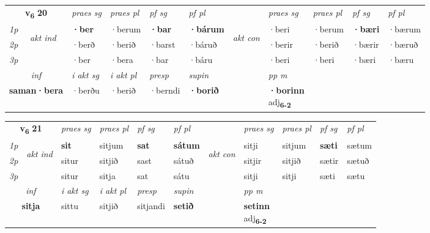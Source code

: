 \noindent
\begin{tabular}{lllllllllll} \toprule
\multicolumn{2}{c}{\textbf{v{\textsubscript{6}}} \Large{\textbf{20}}}  &  \textit{praes sg}  & \textit{praes pl}  &\textit{ pf sg} & \textit{pf pl} &  &  \textit{praes sg}  & \textit{praes pl}  & \textit{pf sg} & \textit{pf pl } \\*
	\cmidrule{3-6} \cmidrule{8-11}
 {\textit{1p}} & \multirow{3}{*}{\begin{turn}{90}\textit{akt ind}\end{turn}} & \textbf{·ber} & ·berum & \textbf{·bar} & \textbf{·bárum} & \multirow{3}{*}{\begin{turn}{90}\textit{akt con}\end{turn}} &·beri & ·berum & \textbf{·bæri} & ·bærum\\*
 {\textit{2p}} &  &  ·berð  & ·berið & ·barst & ·báruð & & ·berir & ·berið & ·bærir & ·bæruð \\*
{\textit{3p}} &  & ·ber & ·bera & ·bar & ·báru & & ·beri & ·beri& ·bæri & ·bæru \\*
\cmidrule{3-6} \cmidrule{8-11}

   \multicolumn{2}{c}{\textit{inf}}  & \textit{i akt sg} & \textit{i akt pl}   & \textit{presp} & \textit{supin}  && \textit{pp m} \\*
  \multicolumn{2}{c}{\textbf{saman\allowbreak ·bera}} & ·berðu  & ·berið   & ·berndi &  \textbf{·borið}  && \specialcell{\textbf{·borinn} \\ adj\textbf{\textsubscript{6-2}}} \\*
\end{tabular}

\noindent
\begin{tabular}{lllllllllll} \toprule
\multicolumn{2}{c}{\textbf{v{\textsubscript{6}}} \Large{\textbf{21}}}  &  \textit{praes sg}  & \textit{praes pl}  &\textit{ pf sg} & \textit{pf pl} &  &  \textit{praes sg}  & \textit{praes pl}  & \textit{pf sg} & \textit{pf pl } \\*
	\cmidrule{3-6} \cmidrule{8-11}
 {\textit{1p}} & \multirow{3}{*}{\begin{turn}{90}\textit{akt ind}\end{turn}} & \textbf{sit} & sitjum & \textbf{sat} & \textbf{sátum} & \multirow{3}{*}{\begin{turn}{90}\textit{akt con}\end{turn}} &sitji & sitjum & \textbf{sæti} & sætum\\*
 {\textit{2p}} &  &  situr  & sitjið & sast & sátuð & & sitjir & sitjið & sætir & sætuð \\*
{\textit{3p}} &  & situr & sitja & sat & sátu & & sitji & sitji& sæti & sætu \\*
\cmidrule{3-6} \cmidrule{8-11}

   \multicolumn{2}{c}{\textit{inf}}  & \textit{i akt sg} & \textit{i akt pl}   & \textit{presp} & \textit{supin}  && \textit{pp m} \\*
  \multicolumn{2}{c}{\textbf{sitja}} & sittu  & sitjið   & sitjandi &  \textbf{setið}  && \specialcell{\textbf{setinn} \\ adj\textbf{\textsubscript{6-2}}} \\*
\end{tabular}


